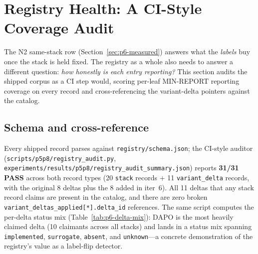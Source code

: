 \documentclass{article}
\providecommand{\secref}[1]{Section~\ref{#1}}
\begin{document}
 \section{Registry Health: A CI-Style Coverage Audit}
\label{sec:p6-health}

The N2 same-stack row (\secref{sec:p6-measured}) answers what the
\emph{labels} buy once the stack is held fixed. The registry as a whole
also needs to answer a different question: \emph{how honestly is each
entry reporting?} This section audits the shipped corpus as a CI step
would, scoring per-leaf MIN-REPORT reporting coverage on every record
and cross-referencing the variant-delta pointers against the catalog.

\subsection{Schema and cross-reference}
Every shipped record parses against \texttt{registry/schema.json}; the
CI-style auditor (\texttt{scripts/p5p8/registry\_audit.py},
\texttt{experiments/results/p5p8/registry\_audit\_summary.json})
reports \textbf{31/31 PASS} across both record types (20 \texttt{stack}
records + 11 \texttt{variant\_delta} records, with the original 8
deltas plus the 8 added in iter~6). All 11 deltas that any stack record
claims are present in the catalog, and there are zero broken
\texttt{variant\_deltas\_applied[*].delta\_id} references. The same
script computes the per-delta status mix
(Table~\ref{tab:p6-delta-mix}): DAPO is the most heavily claimed delta
(10 claimants across all stacks) and lands in a status mix spanning
\texttt{implemented}, \texttt{surrogate}, \texttt{absent}, and
\texttt{unknown}---a concrete demonstration of the registry's value as a
label-flip detector.
\end{document}
